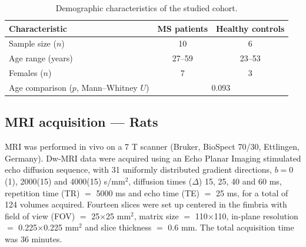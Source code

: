 \documentclass[11pt]{article}
\begin{document}
\begin{table}[h]
\centering
\caption{Demographic characteristics of the studied cohort.}
\label{tab:demographics}
\begin{tabular}{lcc}
\toprule
Characteristic & MS patients & Healthy controls \\
\midrule
Sample size ($n$)       & 10       & 6       \\
Age range (years)       & 27--59   & 23--53  \\
Females ($n$)           & 7        & 3       \\
Age comparison ($p$, Mann--Whitney $U$) & \multicolumn{2}{c}{0.093} \\
\bottomrule
\end{tabular}
\end{table}

\subsection{MRI acquisition --- Rats}
MRI was performed in vivo on a 7 T scanner (Bruker, BioSpect 70/30, Ettlingen, Germany). Dw-MRI data were acquired using an Echo Planar Imaging stimulated echo diffusion sequence, with 31 uniformly distributed gradient directions, $b=0$(1), 2000(15) and 4000(15) s/mm$^2$, diffusion times ($\Delta$) 15, 25, 40 and 60 ms, repetition time (TR) $=$ 5000 ms and echo time (TE) $=$ 25 ms, for a total of 124 volumes acquired. Fourteen slices were set up centered in the fimbria with field of view (FOV) $=$ 25$\times$25 mm$^2$, matrix size $=$ 110$\times$110, in-plane resolution $=$ 0.225$\times$0.225 mm$^2$ and slice thickness $=$ 0.6 mm. The total acquisition time was 36 minutes.
\end{document}
